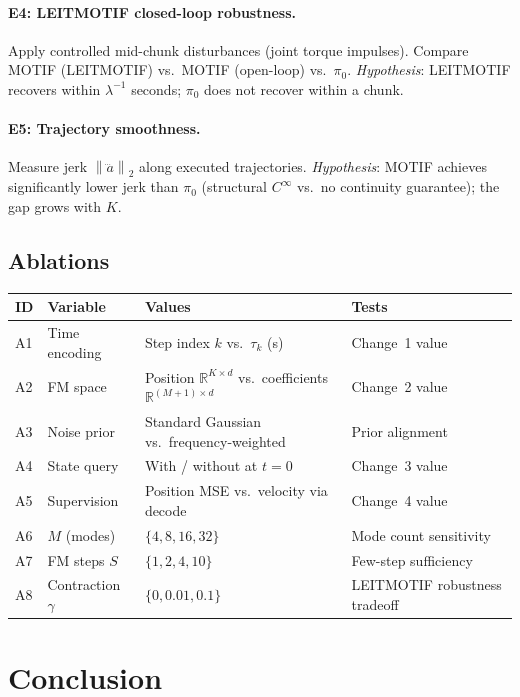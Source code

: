 \documentclass[11pt]{article}
\theoremstyle{plain}
\theoremstyle{definition}
\newcommand{\R}{\mathbb{R}}
\newcommand{\norm}[1]{\left\lVert#1\right\rVert}
\newcommand{\tdiff}{t}
\newcommand{\texec}{\tau}
\begin{document}
\paragraph{E4: LEITMOTIF closed-loop robustness.}
Apply controlled mid-chunk disturbances (joint torque impulses).
Compare MOTIF (LEITMOTIF) vs.\ MOTIF (open-loop) vs.\ $\pi_0$.
\textit{Hypothesis}: LEITMOTIF recovers within $\lambda^{-1}$ seconds;
$\pi_0$ does not recover within a chunk.

\paragraph{E5: Trajectory smoothness.}
Measure jerk $\norm{\dddot{a}}_2$ along executed trajectories.
\textit{Hypothesis}: MOTIF achieves significantly lower jerk than $\pi_0$
(structural $C^\infty$ vs.\ no continuity guarantee);
the gap grows with $K$.

\subsection{Ablations}

\begin{center}
\begin{tabular}{llll}
\toprule
ID & Variable & Values & Tests \\
\midrule
A1 & Time encoding & Step index $k$ vs.\ $\texec_k$ (s) & Change~1 value \\
A2 & FM space & Position $\R^{K\times d}$ vs.\ coefficients $\R^{(M+1)\times d}$ & Change~2 value \\
A3 & Noise prior & Standard Gaussian vs.\ frequency-weighted & Prior alignment \\
A4 & State query & With / without at $\tdiff=0$ & Change~3 value \\
A5 & Supervision & Position MSE vs.\ velocity via decode & Change~4 value \\
A6 & $M$ (modes) & $\{4, 8, 16, 32\}$ & Mode count sensitivity \\
A7 & FM steps $S$ & $\{1, 2, 4, 10\}$ & Few-step sufficiency \\
A8 & Contraction $\gamma$ & $\{0, 0.01, 0.1\}$ & LEITMOTIF robustness tradeoff \\
\bottomrule
\end{tabular}
\end{center}

\section{Conclusion}
\label{sec:conclusion}
\end{document}
